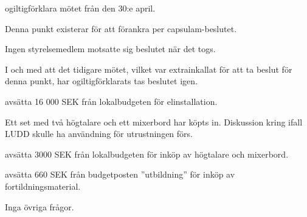 \documentclass{protokoll}
\begin{document}
\begin{beslut}
  \att ogiltigförklara mötet från den 30:e april.
\end{beslut}
Denna punkt existerar för att förankra per capsulam-beslutet. 

Ingen styrelsemedlem motsatte sig beslutet när det togs.

I och med att det tidigare mötet, vilket var extrainkallat för att ta beslut
för denna punkt, har ogiltigförklarats tas beslutet igen. 
\begin{beslut}
  \att avsätta 16 000 SEK från lokalbudgeten för elinstallation.
\end{beslut}

Ett set med två högtalare och ett mixerbord har köpts in.  
Diskussion kring ifall LUDD skulle ha användning för utrustningen förs. 
\begin{beslut}
  \att avsätta 3000 SEK från lokalbudgeten för inköp av högtalare och
  mixerbord. 
\end{beslut}


\begin{beslut}
  \att avsätta 660 SEK från budgetposten ''utbildning'' för inköp av
  fortildningsmaterial.
\end{beslut}

Inga övriga frågor.
\end{document}
